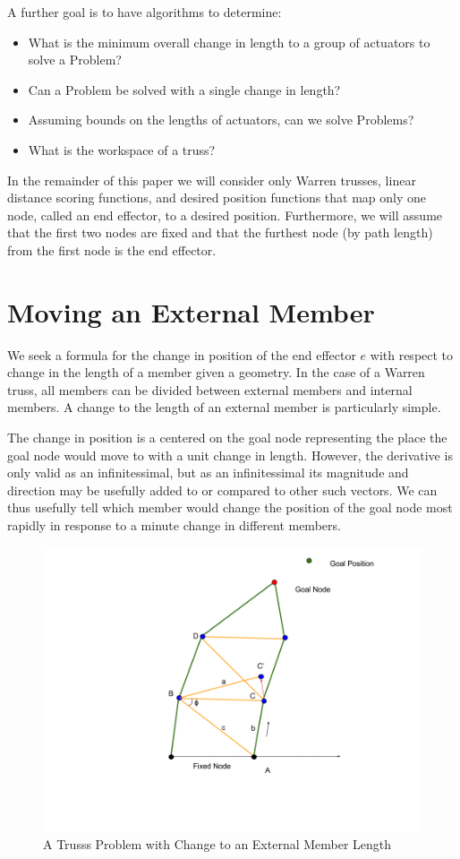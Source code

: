 \documentclass[11pt]{article}
\begin{document}
A further goal is to have algorithms to determine:
\begin{itemize}
\item What is the minimum overall change in length to a group of actuators to solve a Problem?
\item Can a Problem be solved with a single change in length?
\item Assuming bounds on the lengths of actuators, can we solve Problems?
  \item What is the workspace of a truss?
  \end{itemize}

In the remainder of this paper we will consider only Warren trusses, linear distance scoring functions, and desired position functions
that map only one node, called an end effector, to a desired position. Furthermore, we will assume that the first two nodes are fixed
and that the furthest node (by path length) from the first node is the end effector.

\section{Moving an External Member}

We seek a formula for the change in position of the end effector $e$ with respect to change in the length of a member given a geometry.
In the case of a Warren truss, all members can be divided between external members and internal members. A change to the length of an
external member is particularly simple.

The change in position is a centered on the goal node representing the place the goal node would move to with a unit change in length.
However, the derivative is only valid as an infinitessimal, but as an infinitessimal its magnitude and direction may be usefully
added to or compared to other such vectors. We can thus usefully tell which member would change the position of the goal node most
rapidly in response to a minute change in different members.

\begin{figure}
  \centering
  \includegraphics[width=\textwidth]{External_angle_Change.png}
  \caption{A Trusss Problem with Change to an External Member Length}  
\end{figure}
\end{document}
